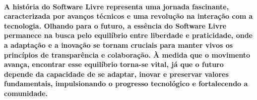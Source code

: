\documentclass[a4paper, 12pt]{article}
\begin{document}
\paragraph{A história do Software Livre representa uma jornada fascinante, caracterizada por avanços técnicos e uma revolução na interação com a tecnologia. Olhando para o futuro, a essência do Software Livre permanece na busca pelo equilíbrio entre liberdade e praticidade, onde a adaptação e a inovação se tornam cruciais para manter vivos os princípios de transparência e colaboração. À medida que o movimento avança, encontrar esse equilíbrio torna-se vital, já que o futuro depende da capacidade de se adaptar, inovar e preservar valores fundamentais, impulsionando o progresso tecnológico e fortalecendo a comunidade.}
\end{document}
